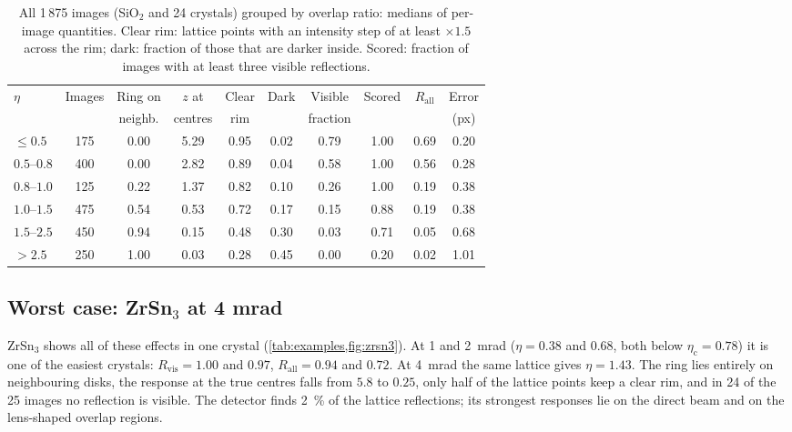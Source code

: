\documentclass[11pt,a4paper]{article}
\newcommand{\Rvis}{R_{\mathrm{vis}}}
\newcommand{\Rall}{R_{\mathrm{all}}}
\newcommand{\etac}{\eta_{\mathrm{c}}}
\begin{document}
\begin{table}[!htbp]
  \centering
  \caption{All 1\,875 images (SiO$_2$ and 24 crystals) grouped by overlap ratio: medians of per-image quantities. Clear
  rim: lattice points with an intensity step of at least $\times 1.5$ across the rim; dark: fraction of those that are
  darker inside. Scored: fraction of images with at least three visible reflections.}
  \label{tab:bins}
  \small
  \begin{tabular}{l c c c c c c c c c}
    \toprule
    $\eta$ & Images & Ring on & $z$ at & Clear & Dark & Visible & Scored & $\Rall$ & Error \\
           &        & neighb. & centres & rim  &      & fraction &       &         & (px) \\
    \midrule
    $\le 0.5$     & 175 & 0.00 & 5.29 & 0.95 & 0.02 & 0.79 & 1.00 & 0.69 & 0.20 \\
    $0.5$--$0.8$  & 400 & 0.00 & 2.82 & 0.89 & 0.04 & 0.58 & 1.00 & 0.56 & 0.28 \\
    $0.8$--$1.0$  & 125 & 0.22 & 1.37 & 0.82 & 0.10 & 0.26 & 1.00 & 0.19 & 0.38 \\
    $1.0$--$1.5$  & 475 & 0.54 & 0.53 & 0.72 & 0.17 & 0.15 & 0.88 & 0.19 & 0.38 \\
    $1.5$--$2.5$  & 450 & 0.94 & 0.15 & 0.48 & 0.30 & 0.03 & 0.71 & 0.05 & 0.68 \\
    $> 2.5$       & 250 & 1.00 & 0.03 & 0.28 & 0.45 & 0.00 & 0.20 & 0.02 & 1.01 \\
    \bottomrule
  \end{tabular}
\end{table}

\subsection{Worst case: ZrSn\texorpdfstring{$_3$}{3} at 4 mrad}\label{sec:zrsn3}
ZrSn$_3$ shows all of these effects in one crystal (\cref{tab:examples,fig:zrsn3}). At 1 and \SI{2}{\milli\radian}
($\eta = 0.38$ and $0.68$, both below $\etac = 0.78$) it is one of the easiest crystals: $\Rvis = 1.00$ and $0.97$,
$\Rall = 0.94$ and $0.72$. At \SI{4}{\milli\radian} the same lattice gives $\eta = 1.43$. The ring lies entirely on
neighbouring disks, the response at the true centres falls from $5.8$ to $0.25$, only half of the lattice points keep a
clear rim, and in 24 of the 25 images no reflection is visible. The detector finds \SI{2}{\percent} of the lattice
reflections; its strongest responses lie on the direct beam and on the lens-shaped overlap regions.
\end{document}
